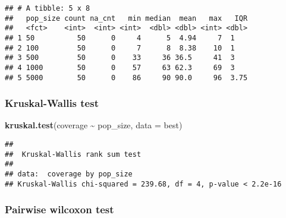 \documentclass[
]{book}
\newenvironment{Shaded}{\begin{snugshade}}{\end{snugshade}}
\newcommand{\AttributeTok}[1]{\textcolor[rgb]{0.13,0.29,0.53}{#1}}
\newcommand{\ConstantTok}[1]{\textcolor[rgb]{0.56,0.35,0.01}{#1}}
\newcommand{\FunctionTok}[1]{\textcolor[rgb]{0.13,0.29,0.53}{\textbf{#1}}}
\newcommand{\NormalTok}[1]{#1}
\newcommand{\SpecialCharTok}[1]{\textcolor[rgb]{0.81,0.36,0.00}{\textbf{#1}}}
\newcommand{\StringTok}[1]{\textcolor[rgb]{0.31,0.60,0.02}{#1}}
\begin{document}
\begin{verbatim}
## # A tibble: 5 x 8
##   pop_size count na_cnt   min median  mean   max   IQR
##   <fct>    <int>  <int> <int>  <dbl> <dbl> <int> <dbl>
## 1 50          50      0     4      5  4.94     7  1   
## 2 100         50      0     7      8  8.38    10  1   
## 3 500         50      0    33     36 36.5     41  3   
## 4 1000        50      0    57     63 62.3     69  3   
## 5 5000        50      0    86     90 90.0     96  3.75
\end{verbatim}

\hypertarget{kruskal-wallis-test-3}{%
\subsubsection{Kruskal-Wallis test}\label{kruskal-wallis-test-3}}

\begin{Shaded}
\begin{Highlighting}[]
\FunctionTok{kruskal.test}\NormalTok{(coverage }\SpecialCharTok{\textasciitilde{}}\NormalTok{ pop\_size, }\AttributeTok{data =}\NormalTok{ best)}
\end{Highlighting}
\end{Shaded}

\begin{verbatim}
## 
##  Kruskal-Wallis rank sum test
## 
## data:  coverage by pop_size
## Kruskal-Wallis chi-squared = 239.68, df = 4, p-value < 2.2e-16
\end{verbatim}

\hypertarget{pairwise-wilcoxon-test-3}{%
\subsubsection{Pairwise wilcoxon test}\label{pairwise-wilcoxon-test-3}}

\begin{Shaded}
\end{Shaded}
\end{document}
